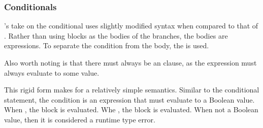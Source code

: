 \subsubsection{Conditionals}

\Poetry{}'s take on the conditional uses slightly modified syntax when
compared to that of \Prose{}. Rather than using blocks as the bodies of
the branches, the bodies are expressions. To separate the condition from
the body, the  is used.

Also worth noting is that there must always be an  clause, as
the expression must always evaluate to some value.

\begin{bnf*}
\end{bnf*}

This rigid form makes for a relatively simple semantics. Similar to the
conditional statement, the condition is an expression that must evaluate
to a Boolean value. When , the  block is evaluated.
Whe , the  block is evaluated. When not a Boolean value,
then it is considered a runtime type error.

\begin{prooftree}
\end{prooftree}

\begin{prooftree}
\end{prooftree}
